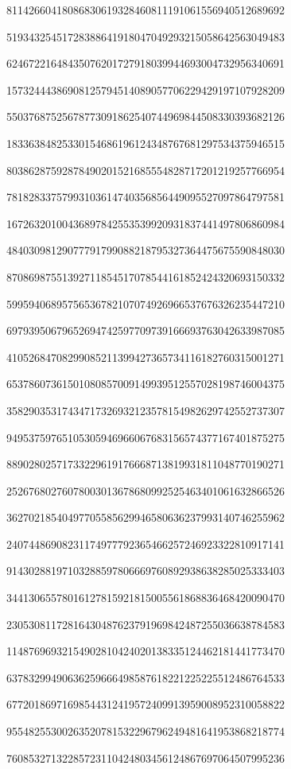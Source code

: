 \begin{center}
81142660418086830619328460811191061556940512689692

51934325451728388641918047049293215058642563049483

62467221648435076201727918039944693004732956340691

15732444386908125794514089057706229429197107928209

55037687525678773091862540744969844508330393682126

18336384825330154686196124348767681297534375946515

80386287592878490201521685554828717201219257766954

78182833757993103614740356856449095527097864797581

16726320100436897842553539920931837441497806860984

48403098129077791799088218795327364475675590848030

87086987551392711854517078544161852424320693150332

59959406895756536782107074926966537676326235447210

69793950679652694742597709739166693763042633987085

41052684708299085211399427365734116182760315001271

65378607361501080857009149939512557028198746004375

35829035317434717326932123578154982629742552737307

94953759765105305946966067683156574377167401875275

88902802571733229619176668713819931811048770190271

25267680276078003013678680992525463401061632866526

36270218540497705585629946580636237993140746255962

24074486908231174977792365466257246923322810917141

91430288197103288597806669760892938638285025333403

34413065578016127815921815005561868836468420090470

23053081172816430487623791969842487255036638784583

11487696932154902810424020138335124462181441773470

63783299490636259666498587618221225225512486764533

67720186971698544312419572409913959008952310058822

95548255300263520781532296796249481641953868218774

76085327132285723110424803456124867697064507995236


\end{center}

